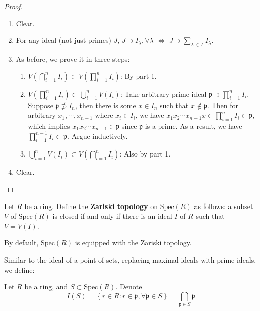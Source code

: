 \documentclass{note-eng}
\begin{document}
\begin{proof}
    \begin{enumerate}
        \item Clear.
        \item For any ideal (not just primes) $J$, $J \supset I_\lambda, \forall \lambda$ $\Leftrightarrow$ $J \supset \sum\limits_{\lambda \in \Lambda} I_\lambda$.
        \item As before, we prove it in three steps:
        \begin{enumerate}
            \item $V \left(\bigcap\limits_{i = 1}^{n} I_i\right) \subset V \left(\prod\limits_{i = 1}^{n} I_i\right)$: By part 1.
            \item $V \left(\prod\limits_{i = 1}^{n} I_i\right) \subset \bigcup\limits_{i = 1}^{n} V(I_i)$: Take arbitrary prime ideal $\mathfrak{p} \supset \prod\limits_{i = 1}^{n} I_i$. Suppose $\mathfrak{p} \not \supset I_{n}$, then there is some $x \in I_{n}$ such that $x \notin \mathfrak{p}$. Then for arbitrary $x_1, \cdots, x_{n - 1}$ where $x_i \in I_i$, we have $x_1x_2 \cdots x_{n - 1}x \in \prod\limits_{i = 1}^{n} I_i \subset \mathfrak{p}$, which implies $x_1 x_2 \cdots x_{n - 1} \in \mathfrak{p}$ since $\mathfrak{p}$ is a prime. As a result, we have $\prod\limits_{i = 1}^{n - 1} I_i \subset \mathfrak{p}$. Argue inductively.
            \item $\bigcup\limits_{i = 1}^{n} V(I_i) \subset V \left(\bigcap\limits_{i = 1}^{n} I_i\right)$: Also by part 1.
        \end{enumerate}
        \item Clear.
    \end{enumerate}
\end{proof}

\begin{definition}
    Let $R$ be a ring. Define the \textbf{Zariski topology} on $\mathrm{Spec}(R)$ as follows: a subset $V$ of $\mathrm{Spec}(R)$ is closed if and only if there is an ideal $I$ of $R$ such that $V = V(I)$.

    By default, $\mathrm{Spec}(R)$ is equipped with the Zariski topology.
\end{definition}

Similar to the ideal of a point of sets, replacing maximal ideals with prime ideals, we define:

\begin{notation}
    Let $R$ be a ring, and $S \subset \mathrm{Spec}(R)$. Denote
    $$I(S) = \left\lbrace r \in R: r \in \mathfrak{p}, \forall \mathfrak{p} \in S \right\rbrace = \bigcap\limits_{\mathfrak{p} \in S} \mathfrak{p}$$
\end{notation}
\end{document}
